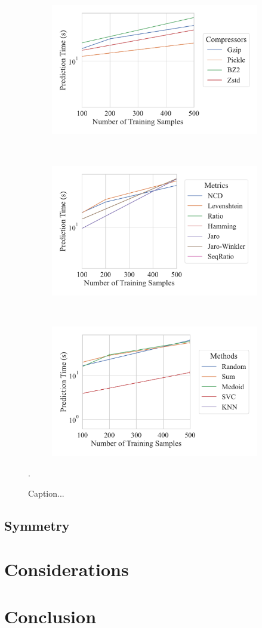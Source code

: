 \documentclass[sigconf]{acmart}
\begin{document}
\begin{figure}
	\begin{subfigure}
		\centering
		\includegraphics[width=.32\textwidth]{figs/truthseeker/compressor_vs_predict_time.pdf}
	\end{subfigure}%
	~
	\begin{subfigure}
		\centering
		\includegraphics[width=.32\textwidth]{figs/truthseeker/metric_vs_predict_time.pdf}
	\end{subfigure}
	~
	\begin{subfigure}
		\centering
		\includegraphics[width=.32\textwidth]{figs/truthseeker/method_vs_predict_time.pdf}
	\end{subfigure}
	\caption{ Caption...}.
	\label{fig:accuracy}
\end{figure}

\subsection{Symmetry}



\label{results}
\section{Considerations}
\label{considerations}
\section{Conclusion}
\label{conclusion}
\end{document}
